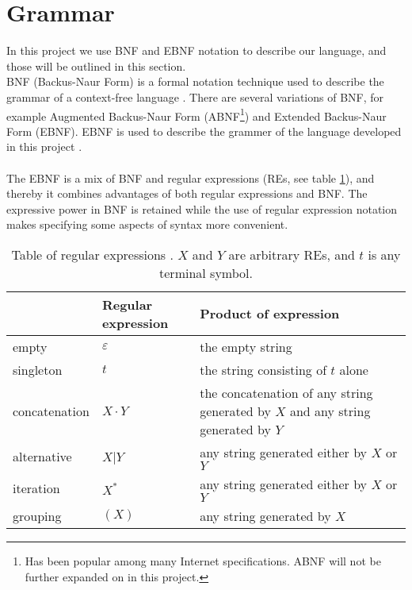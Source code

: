 \section{Grammar}
\label{sec:ebnf}

In this project we use BNF and EBNF notation to describe our language, and those will be outlined in this section.\\ \indent
BNF (Backus-Naur Form) is a formal notation technique used to describe the grammar of a context-free language \cite{misc:ss}. There are several variations of BNF, for example Augmented Backus-Naur Form (ABNF\footnote{Has been popular among many
   Internet specifications. ABNF will not be further expanded on in this project.}) and Extended Backus-Naur Form (EBNF). EBNF is used to describe the grammer of the language developed in this project \cite{misc:spo}.\\
\\
The EBNF is a mix of BNF and regular expressions (REs, see table \ref{tab:re}), and thereby it combines advantages of both regular expressions and BNF. The expressive power in BNF is retained while the use of regular expression notation makes specifying some aspects of syntax more convenient.

\begin{center}
	\begin{table}[H]
    \begin{tabular}{ | l | l | p{6.5cm} |}
    \hline
     & Regular expression & Product of expression\\ \hline
    empty & $\varepsilon$ & the empty string\\ \hline
    singleton & $t$ & the string consisting of $t$ alone\\ \hline
    concatenation & $X \cdot Y$ & the concatenation of any string generated	by $X$ and any string generated by $Y$\\ \hline
		alternative & $X$|$Y$ & any string generated either by $X$ or $Y$\\ \hline
		iteration & $X^*$ & any string generated either by $X$ or $Y$\\ \hline
		grouping & $(X)$ & any string generated by $X$\\ \hline
    \end{tabular}
		\caption{Table of regular expressions \cite{misc:spo}. $X$ and $Y$ are arbitrary REs, and $t$ is any terminal symbol.}
		\label{tab:re}
	\end{table}
\end{center}

